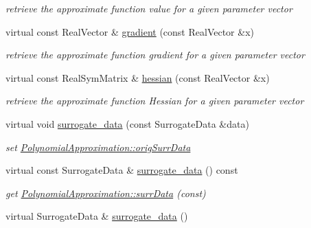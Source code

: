 \begin{DoxyCompactItemize}
\begin{DoxyCompactList}\small\item\em retrieve the approximate function value for a given parameter vector \end{DoxyCompactList}\item 
virtual const Real\+Vector \& \hyperlink{classPecos_1_1BasisApproximation_a42bf374bf23c32c941ee2acae5ad56a4}{gradient} (const Real\+Vector \&x)\label{classPecos_1_1BasisApproximation_a42bf374bf23c32c941ee2acae5ad56a4}

\begin{DoxyCompactList}\small\item\em retrieve the approximate function gradient for a given parameter vector \end{DoxyCompactList}\item 
virtual const Real\+Sym\+Matrix \& \hyperlink{classPecos_1_1BasisApproximation_ad0b8d39aa7ec7b96b8753ac84e806d42}{hessian} (const Real\+Vector \&x)\label{classPecos_1_1BasisApproximation_ad0b8d39aa7ec7b96b8753ac84e806d42}

\begin{DoxyCompactList}\small\item\em retrieve the approximate function Hessian for a given parameter vector \end{DoxyCompactList}\item 
virtual void \hyperlink{classPecos_1_1BasisApproximation_aa1896011336650ae7b14965aebd72e1e}{surrogate\+\_\+data} (const Surrogate\+Data \&data)\label{classPecos_1_1BasisApproximation_aa1896011336650ae7b14965aebd72e1e}

\begin{DoxyCompactList}\small\item\em set \hyperlink{classPecos_1_1PolynomialApproximation_adea5235bed42287989f0bf6821f9bcf0}{Polynomial\+Approximation\+::orig\+Surr\+Data} \end{DoxyCompactList}\item 
virtual const Surrogate\+Data \& \hyperlink{classPecos_1_1BasisApproximation_a8b84d7f8e6de5203f20a47fa66b38ed3}{surrogate\+\_\+data} () const \label{classPecos_1_1BasisApproximation_a8b84d7f8e6de5203f20a47fa66b38ed3}

\begin{DoxyCompactList}\small\item\em get \hyperlink{classPecos_1_1PolynomialApproximation_a8e8d62a29dcb5dd55fd03bef1a2b3ea6}{Polynomial\+Approximation\+::surr\+Data} (const) \end{DoxyCompactList}\item 
virtual Surrogate\+Data \& \hyperlink{classPecos_1_1BasisApproximation_a0acf94a33f9a66b6823627d75ce566d4}{surrogate\+\_\+data} ()\label{classPecos_1_1BasisApproximation_a0acf94a33f9a66b6823627d75ce566d4}


\end{DoxyCompactItemize}
